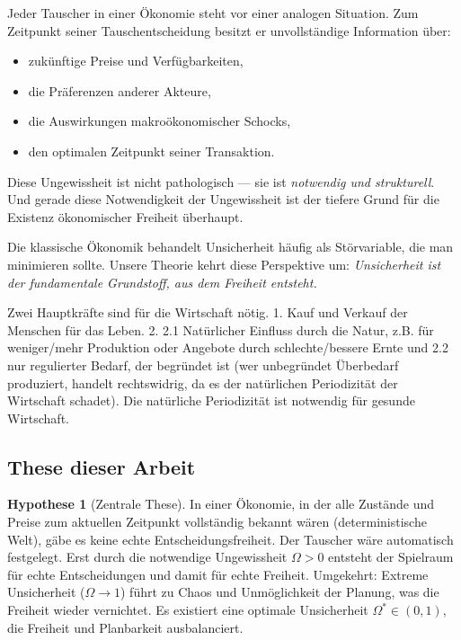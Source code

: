 \documentclass[a4paper,12pt]{article}
\theoremstyle{definition}
\newtheorem{hypothese}{Hypothese}
\begin{document}
Jeder Tauscher in einer Ökonomie steht vor einer analogen Situation. Zum Zeitpunkt seiner Tauschentscheidung besitzt er unvollständige Information über:
\begin{itemize}
    \item zukünftige Preise und Verfügbarkeiten,
    \item die Präferenzen anderer Akteure,
    \item die Auswirkungen makroökonomischer Schocks,
    \item den optimalen Zeitpunkt seiner Transaktion.
\end{itemize}

Diese Ungewissheit ist nicht pathologisch --- sie ist \emph{notwendig und strukturell}. Und gerade diese Notwendigkeit der Ungewissheit ist der tiefere Grund für die Existenz ökonomischer Freiheit überhaupt.

Die klassische Ökonomik behandelt Unsicherheit häufig als Störvariable, die man minimieren sollte. Unsere Theorie kehrt diese Perspektive um: \emph{Unsicherheit ist der fundamentale Grundstoff, aus dem Freiheit entsteht.}

Zwei Hauptkräfte sind für die Wirtschaft nötig. 1. Kauf und Verkauf der Menschen für das Leben. 2. 2.1 Natürlicher Einfluss durch die Natur, z.B. für weniger/mehr Produktion oder Angebote durch schlechte/bessere Ernte und 2.2 nur regulierter Bedarf, der begründet ist (wer unbegründet Überbedarf produziert, handelt rechtswidrig, da es der natürlichen Periodizität der Wirtschaft schadet). Die natürliche Periodizität ist notwendig für gesunde Wirtschaft.

\subsection{These dieser Arbeit}

\begin{hypothese}[Zentrale These]
    In einer Ökonomie, in der alle Zustände und Preise zum aktuellen Zeitpunkt vollständig bekannt wären (deterministische Welt), gäbe es keine echte Entscheidungsfreiheit. Der Tauscher wäre automatisch festgelegt. Erst durch die notwendige Ungewissheit $\Omega > 0$ entsteht der Spielraum für echte Entscheidungen und damit für echte Freiheit. Umgekehrt: Extreme Unsicherheit ($\Omega \to 1$) führt zu Chaos und Unmöglichkeit der Planung, was die Freiheit wieder vernichtet. Es existiert eine optimale Unsicherheit $\Omega^* \in (0,1)$, die Freiheit und Planbarkeit ausbalanciert.
\end{hypothese}
\end{document}
